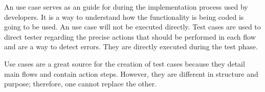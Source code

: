 An use case serves as an guide for during the implementation process used by developers. It is a way to understand how the functionality is being coded is going to be used. An use case will not be executed directly. Test cases are used to direct tester regarding the precise actions that should be performed in each flow and are a way to detect errors. They are directly executed during the test phase.

Use cases are a great source for the creation of test cases because they detail main flows and contain action steps. However, they are different in structure and purpose; therefore, one cannot replace the other.

